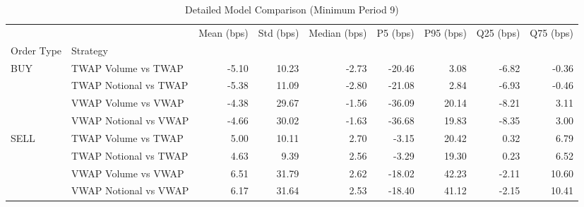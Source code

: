 \begin{table}
\caption{Detailed Model Comparison (Minimum Period 9)}
\label{tab:detailed_min_period_9}
\begin{tabular}{l|l|rrrrrrr}
\toprule
 &  & Mean (bps) & Std (bps) & Median (bps) & P5 (bps) & P95 (bps) & Q25 (bps) & Q75 (bps) \\
Order Type & Strategy &  &  &  &  &  &  &  \\
\midrule
\multirow[t]{4}{*}{BUY} & TWAP Volume vs TWAP & -5.10 & 10.23 & -2.73 & -20.46 & 3.08 & -6.82 & -0.36 \\
 & TWAP Notional vs TWAP & -5.38 & 11.09 & -2.80 & -21.08 & 2.84 & -6.93 & -0.46 \\
 & VWAP Volume vs VWAP & -4.38 & 29.67 & -1.56 & -36.09 & 20.14 & -8.21 & 3.11 \\
 & VWAP Notional vs VWAP & -4.66 & 30.02 & -1.63 & -36.68 & 19.83 & -8.35 & 3.00 \\
\cline{1-9}
\multirow[t]{4}{*}{SELL} & TWAP Volume vs TWAP & 5.00 & 10.11 & 2.70 & -3.15 & 20.42 & 0.32 & 6.79 \\
 & TWAP Notional vs TWAP & 4.63 & 9.39 & 2.56 & -3.29 & 19.30 & 0.23 & 6.52 \\
 & VWAP Volume vs VWAP & 6.51 & 31.79 & 2.62 & -18.02 & 42.23 & -2.11 & 10.60 \\
 & VWAP Notional vs VWAP & 6.17 & 31.64 & 2.53 & -18.40 & 41.12 & -2.15 & 10.41 \\
\cline{1-9}
\bottomrule
\end{tabular}
\end{table}
